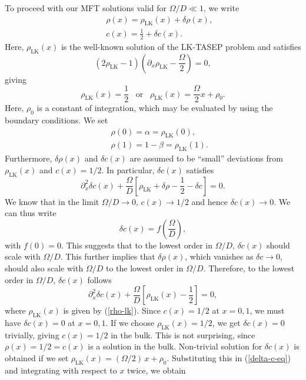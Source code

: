 \documentclass[aps,pre,twocolumn,superscriptaddress,amsmath,amssymb,longbibliography,floatfix,nofootinbib]{revtex4}
\begin{document}
{To proceed with our MFT solutions valid for $\Omega/D\ll 1$, we write
\begin{eqnarray}
 &&\rho(x)=\rho_\text{LK}(x) + \delta\rho(x), \label{del-rho-def}\\ 
 && c(x) = \frac{1}{2} + \delta c(x). \label{del-c-def}
\end{eqnarray}
Here, $\rho_\text{LK}(x)$ is the well-known solution of the LK-TASEP problem and satisfies
\begin{equation}
 (2\rho_\text{LK}-1)(\partial_x \rho_\text{LK}-\frac{\Omega}{2})=0,
\end{equation}
giving
\begin{equation}
 \rho_\text{LK}(x)=\frac{1}{2}\;\;\;\text{or}\;\;\;\rho_\text{LK}(x)= \frac{\Omega}{2}x+\rho_0.\label{rho-lk}
\end{equation}
Here, $\rho_0$ is a constant of integration, which may be evaluated by using the boundary conditions. We set
\begin{eqnarray}
 &&\rho(0)=\alpha=\rho_\text{LK}(0),\label{bc-1}\\
 &&\rho(1)=1-\beta = \rho_\text{LK}(1).\label{bc-2}
\end{eqnarray}
Furthermore, $\delta\rho(x)$ and $\delta c(x)$ are assumed to be ``small'' deviations from $\rho_\text{LK}(x)$ and $c(x)=1/2$. In particular, $\delta c(x)$ satisfies
\begin{equation}
 \partial_x^2 \delta c(x)+ \frac{\Omega}{D}\left[\rho_\text{LK}+\delta\rho - \frac{1}{2}-\delta c\right]=0.
\end{equation}
We know that in the limit $\Omega/D\rightarrow 0$, $c(x)\rightarrow 1/2$ and hence $\delta c(x)\rightarrow 0$. We can thus write
\begin{equation}
 \delta c(x) = f (\frac{\Omega}{D}),
\end{equation}
with $f(0)=0$. This suggests that to the lowest order in $\Omega/D$, $\delta c(x)$ should scale with $\Omega/D$. This further implies that $\delta \rho(x)$, which vanishes as $\delta c\rightarrow 0$, should also scale with $\Omega/D$ to the lowest order in $\Omega/D$. Therefore, to the lowest order in $\Omega/D$, $\delta c(x)$ follows
\begin{equation}
 \partial_x^2 \delta c(x) +\frac{\Omega}{D}[\rho_\text{LK}(x)-\frac{1}{2}]=0, \label{delta-c-eq}
\end{equation}
where $\rho_\text{LK}(x)$ is given by (\ref{rho-lk}). Since $c(x)=1/2$ at $x=0,1$, we must have $\delta c(x)=0$ at $x=0,1$. If we choose $\rho_\text{LK}(x)=1/2$, we get $\delta c(x)=0$ trivially, giving $c(x)=1/2$ in the bulk. This is not surprising, since $\rho(x)=1/2=c(x)$ is a solution in the bulk. Non-trivial solution for $\delta c(x)$ is obtained if we set $\rho_\text{LK}(x)= (\Omega/2)\, x+\rho_0$. Substituting this in (\ref{delta-c-eq}) and integrating with respect to $x$ twice, we obtain
}
\end{document}
